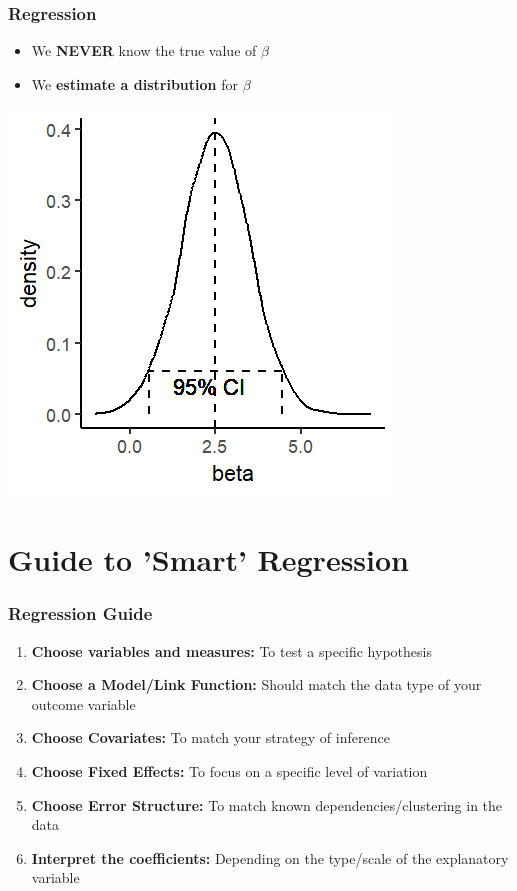 \documentclass[xcolor=x11names,compress]{beamer}\usepackage[]{graphicx}\usepackage[]{color}
\makeatletter
\def\maxwidth{ %
  \ifdim\Gin@nat@width>\linewidth
    \linewidth
  \else
    \Gin@nat@width
  \fi
}
\newenvironment{knitrout}{}{} %
\renewcommand{\(}{\begin{columns}}
\renewcommand{\)}{\end{columns}}
\newcommand{\<}[1]{\begin{column}{#1}}
\renewcommand{\>}{\end{column}}
\makeatother
\begin{document}
\begin{frame}
\frametitle{Regression}
\begin{itemize}
\item We \textbf{NEVER} know the true value of $\beta$
\item We \textbf{estimate a distribution} for $\beta$
\end{itemize}
\begin{knitrout}
\color{fgcolor}
\includegraphics[width=\maxwidth]{figure/beta_dist5-1} 

\end{knitrout}
\end{frame}


\section{Guide to 'Smart' Regression}

\begin{frame}
\frametitle{Regression Guide}
\begin{enumerate}
\item \textbf{Choose variables and measures:} To test a specific hypothesis
\item \textbf{Choose a Model/Link Function:} Should match the data type of your outcome variable
\item \textbf{Choose Covariates:} To match your strategy of inference
\item \textbf{Choose Fixed Effects:} To focus on a specific level of variation
\item \textbf{Choose Error Structure:} To match known dependencies/clustering in the data
\item \textbf{Interpret the coefficients:} Depending on the type/scale of the explanatory variable
\end{enumerate}
\end{frame}
\end{document}

